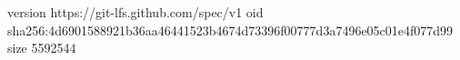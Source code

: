 version https://git-lfs.github.com/spec/v1
oid sha256:4d6901588921b36aa46441523b4674d73396f00777d3a7496e05c01e4f077d99
size 5592544

